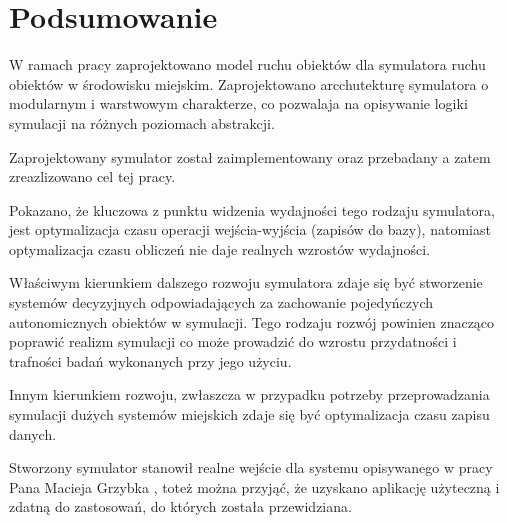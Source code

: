\chapter{Podsumowanie}
\par{
W ramach pracy zaprojektowano model ruchu obiektów dla symulatora ruchu obiektów w środowisku miejskim. Zaprojektowano arcchutekturę symulatora o modularnym i warstwowym charakterze, co pozwalaja na opisywanie logiki symulacji na różnych poziomach abstrakcji.
}
\par{
Zaprojektowany symulator został zaimplementowany oraz przebadany a zatem zreazlizowano cel tej pracy.
}
\par{
Pokazano, że kluczowa z punktu widzenia wydajności tego rodzaju symulatora, jest optymalizacja czasu operacji wejścia-wyjścia (zapisów do bazy), natomiast optymalizacja czasu obliczeń nie daje realnych wzrostów wydajności.
}
\par{
Właściwym kierunkiem dalszego rozwoju symulatora zdaje się być stworzenie systemów decyzyjnych odpowiadających za zachowanie pojedyńczych autonomicznych obiektów w symulacji. Tego rodzaju rozwój powinien znacząco poprawić realizm symulacji co może prowadzić do wzrostu przydatności i trafności badań wykonanych przy jego użyciu.
}
\par{
Innym kierunkiem rozwoju, zwłaszcza w przypadku potrzeby przeprowadzania symulacji dużych systemów miejskich zdaje się być optymalizacja czasu zapisu danych.
}
\par{
Stworzony symulator stanowił realne wejście dla systemu opisywanego w pracy Pana Macieja Grzybka \cite{Grzybek}, toteż można przyjąć, że uzyskano aplikację użyteczną i zdatną do zastosowań, do których została przewidziana.
}